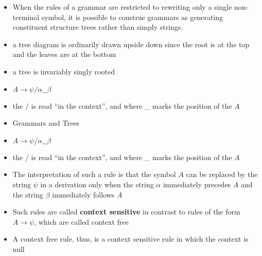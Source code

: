 \documentclass{beamer}
\begin{document}
	\begin{frame}
		\begin{itemize}
			\item When the rules of a grammar are restricted to rewriting only a single non-terminal symbol, it is possible to construe grammars as generating constituent structure trees rather than simply strings.
			\item a tree diagram is ordinarily drawn upside down since the root is at the top and the leaves are at the bottom
			\item a tree is invariably singly rooted
		\end{itemize}
	\end{frame}


	\begin{frame}
		\begin{itemize}
			\item $A \rightarrow \psi / \alpha \_\_ \beta$
			\item the $/$ is read ``in the context'', and where \_ marks the position of the $A$
		\end{itemize}
	\end{frame}


	\begin{frame}
		\begin{itemize}
			\item Grammars and Trees
			\item $A \rightarrow \psi / \alpha \_\_ \beta$
			\item the $/$ is read ``in the context'', and where \_ marks the position of the $A$
			\item The interpretation of such a rule is that the symbol $A$ can be replaced by the string $\psi$ in a derivation only when the string $\alpha$ immediately precedes $A$ and the string $\beta$ immediately follows $A$
		\end{itemize}
	\end{frame}


	\begin{frame}
		\begin{itemize}
			\item Such rules are called \textbf{context sensitive} in contrast to rules of the form $A \rightarrow \psi$, which are called context free
			\item A context free rule, thus, is a context sensitive rule in which the context is null
		\end{itemize}
	\end{frame}
\end{document}
